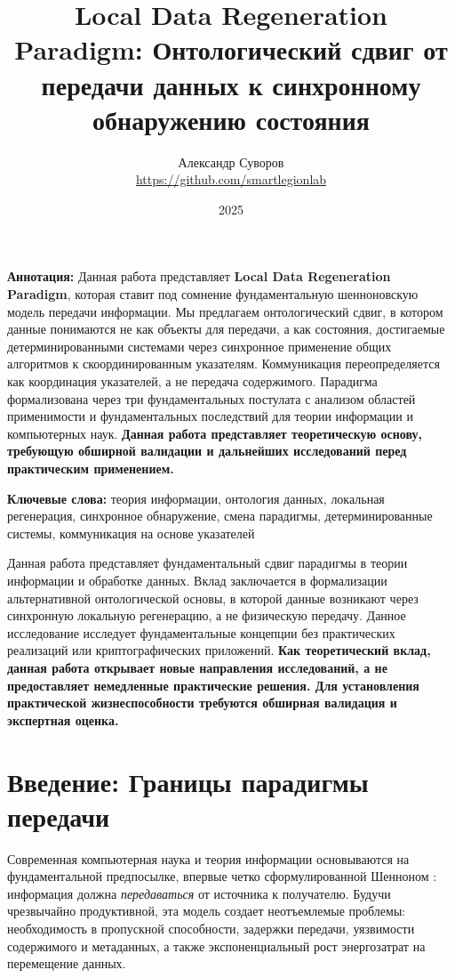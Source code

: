 \documentclass[11pt,a4paper]{article}
\title{Local Data Regeneration Paradigm: Онтологический сдвиг от передачи данных к синхронному обнаружению состояния}
\author{Александр Суворов \\ \url{https://github.com/smartlegionlab}}
\date{2025}
\begin{document}
\maketitle

\begin{summarybox}
\textbf{Аннотация:} Данная работа представляет \textbf{Local Data Regeneration Paradigm}, которая ставит под сомнение фундаментальную шенноновскую модель передачи информации. Мы предлагаем онтологический сдвиг, в котором данные понимаются не как объекты для передачи, а как состояния, достигаемые детерминированными системами через синхронное применение общих алгоритмов к скоординированным указателям. Коммуникация переопределяется как координация указателей, а не передача содержимого. Парадигма формализована через три фундаментальных постулата с анализом областей применимости и фундаментальных последствий для теории информации и компьютерных наук. \textbf{Данная работа представляет теоретическую основу, требующую обширной валидации и дальнейших исследований перед практическим применением.}
\end{summarybox}

\textbf{Ключевые слова:} теория информации, онтология данных, локальная регенерация, синхронное обнаружение, смена парадигмы, детерминированные системы, коммуникация на основе указателей

\begin{importantbox}
Данная работа представляет фундаментальный сдвиг парадигмы в теории информации и обработке данных. Вклад заключается в формализации альтернативной онтологической основы, в которой данные возникают через синхронную локальную регенерацию, а не физическую передачу. Данное исследование исследует фундаментальные концепции без практических реализаций или криптографических приложений. \textbf{Как теоретический вклад, данная работа открывает новые направления исследований, а не предоставляет немедленные практические решения. Для установления практической жизнеспособности требуются обширная валидация и экспертная оценка.}
\end{importantbox}

\section{Введение: Границы парадигмы передачи}

Современная компьютерная наука и теория информации основываются на фундаментальной предпосылке, впервые четко сформулированной Шенноном \cite{shannon}: информация должна \emph{передаваться} от источника к получателю. Будучи чрезвычайно продуктивной, эта модель создает неотъемлемые проблемы: необходимость в пропускной способности, задержки передачи, уязвимости содержимого и метаданных, а также экспоненциальный рост энергозатрат на перемещение данных.
\end{document}
